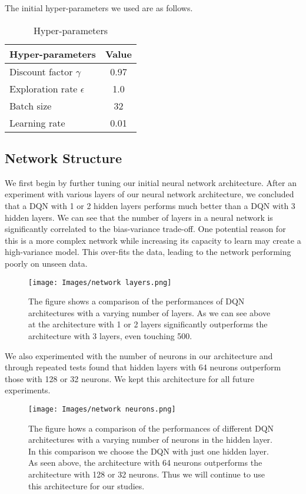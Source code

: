 \documentclass{article}
\begin{document}
The initial hyper-parameters we used are as follows. 

\begin{table}[htbp]
\centering
\begin{tabular}{|l|c|}
\hline
\textbf{Hyper-parameters} & \textbf{Value} \\
\hline
Discount factor $\gamma$ & 0.97 \\
\hline
Exploration rate $\epsilon$ & 1.0 \\
\hline
Batch size & 32 \\
\hline
Learning rate & 0.01 \\
\hline
\end{tabular}
\caption{Hyper-parameters}
\label{tab:hyper-parameters}
\end{table}


\subsection{Network Structure}

We first begin by further tuning our initial neural network architecture. 
After an experiment with various layers of our neural network architecture, we concluded that a DQN with 1 or 2 hidden layers performs much better than a DQN with 3 hidden layers. We can see that the number of layers in a neural network is significantly correlated to the bias-variance trade-off. One potential reason for this is a more complex network while increasing its capacity to learn may create a high-variance model. This over-fits the data, leading to the network performing poorly on unseen data.

\textbf{}
\begin{figure}[htbp]
\centering
\texttt{[image: Images/network layers.png]}
\caption{\label{fig:Comparison of Q-network Layers}The figure shows a comparison of the performances of DQN architectures with a varying number of layers. As we can see above at the architecture with 1 or 2 layers significantly outperforms the architecture with 3 layers, even touching 500.}
\end{figure}



We also experimented with the number of neurons in our architecture and through repeated tests found that hidden layers with 64 neurons outperform those with 128 or 32 neurons. We kept this architecture for all future experiments.
\begin{figure}[h!]
\centering
\texttt{[image: Images/network neurons.png]}
\caption{\label{fig:Comparison of Q-network neurons}The figure hows a comparison of the performances of different DQN architectures with a varying number of neurons in the hidden layer. In this comparison we choose the DQN with just one hidden layer. As seen above, the architecture with 64 neurons outperforms the architecture with 128 or 32 neurons. Thus we will continue to use this architecture for our studies. }
\end{figure}
\end{document}
